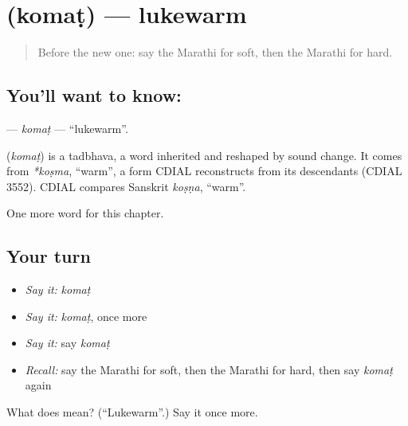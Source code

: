 \section[\texorpdfstring{\mr{कोमट} (komaṭ)}{कोमट (komaṭ)}]{ (komaṭ) — lukewarm}

\label{lesson:MR-C148-komat}



\begin{quote}
Before the new one: say the Marathi for soft, then the Marathi for hard.
\end{quote}

\subsection*{You'll want to know: }
\textbf{} — \emph{komaṭ} — \textquotedblleft{}lukewarm\textquotedblright{}.

\begin{cousinweb}
\textbf{} (\emph{komaṭ}) is a tadbhava, a word inherited and reshaped by sound change. It comes from \emph{*koṣma}, \textquotedblleft{}warm\textquotedblright{}, a form CDIAL reconstructs from its descendants (CDIAL 3552). CDIAL compares Sanskrit \emph{koṣṇa}, \textquotedblleft{}warm\textquotedblright{}.
\end{cousinweb}

\begin{grammarlens}[title={What you've built}]
One more word for this chapter.
\end{grammarlens}

\subsection*{Your turn}
\begin{itemize}
\raggedright
  \item \emph{Say it:} \emph{komaṭ}
  \item \emph{Say it:} \emph{komaṭ}, once more
  \item \emph{Say it:} say \emph{komaṭ}
  \item \emph{Recall:} say the Marathi for soft, then the Marathi for hard, then say \emph{komaṭ} again
\end{itemize}

\begin{tcolorbox}[breakable,colback=teal!4,colframe=teal!35!black,title={Before you move on}]
What does  mean? (\textquotedblleft{}Lukewarm\textquotedblright{}.) Say it once more.
\end{tcolorbox}
